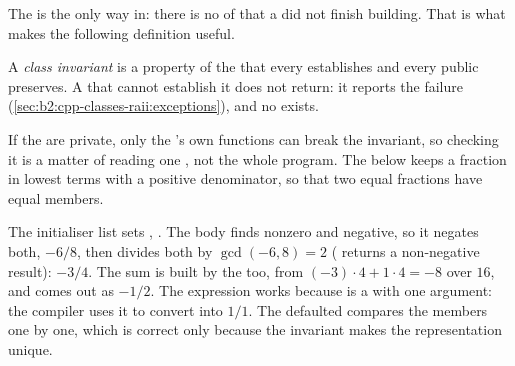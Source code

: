 The  is the only way in: there is no  of  that a  did not finish building. That
is what makes the following definition useful.

\begin{definition}\label{def:b2:cpp-classes-raii:class-invariant}
A \emph{class invariant} is a property of the  that every 
establishes and every public  preserves. A  that cannot establish it does not return:
it reports the failure (\cref{sec:b2:cpp-classes-raii:exceptions}), and no  exists.
\end{definition}

If the  are private, only the 's own functions can break the invariant, so checking it is a matter
of reading one , not the whole program. The  below keeps a fraction in lowest terms with a positive
denominator, so that two equal fractions have equal members.

\label{lst:b2:cpp-classes-raii:fraction}

\label{lst:b2:cpp-classes-raii:fraction-demo}

\label{out:b2:cpp-classes-raii:fraction-demo}

\begin{example}[Building $6/(-8)$]\label{ex:b2:cpp-classes-raii:fraction}
The initialiser list sets , . The body finds  nonzero and negative, so it
negates both, $-6/8$, then divides both by $\gcd(-6, 8) = 2$ ( returns a non-negative result):
$-3/4$. The sum  is built by the  too, from $(-3)\cdot 4 + 1 \cdot 4 = -8$ over $16$, and
comes out as $-1/2$. The expression  works because  is a  with one
argument: the compiler uses it to convert  into $1/1$. The defaulted  compares the members
one by one, which is correct only because the invariant makes the representation unique.
\end{example}

